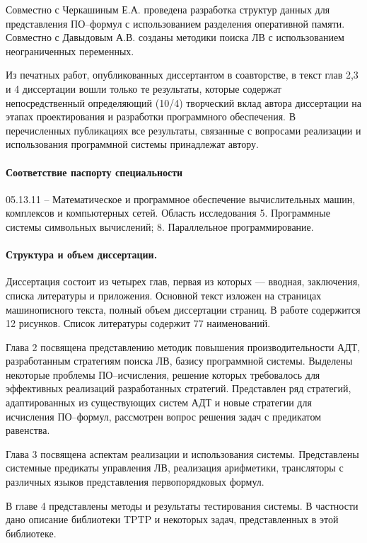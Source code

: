 Совместно с Черкашиным Е.А. проведена разработка структур данных для представления ПО--формул с использованием разделения оперативной памяти. Совместно с Давыдовым А.В. созданы методики поиска ЛВ с использованием неограниченных переменных.

Из печатных работ, опубликованных диссертантом в соавторстве, в текст глав 2,3 и 4 диссертации вошли только те результаты, которые содержат непосредственный определяющий (10/4) творческий вклад автора диссертации на этапах проектирования и разработки программного обеспечения. В перечисленных публикациях все результаты, связанные с вопросами реализации и использования программной системы принадлежат автору.

\paragraph{Соответствие паспорту специальности}
05.13.11 -- Математическое и программное обеспечение вычислительных машин, комплексов и компьютерных сетей. Область исследования 5. Программные системы символьных вычислений; 8. Параллельное программирование.

\paragraph{Структура и объем диссертации.} Диссертация состоит из четырех глав, первая из которых --- вводная, заключения, списка литературы и приложения. Основной текст изложен на \pageref{pg:main} страницах машинописного текста, полный объем диссертации \pageref{pg:total} страниц. В работе содержится 12 рисунков. Список литературы содержит 77 наименований.

Глава 2 посвящена представлению методик повышения производительности АДТ, разработанным стратегиям поиска ЛВ, базису программной системы. Выделены некоторые проблемы ПО--исчисления, решение которых требовалось для эффективных реализаций разработанных стратегий. Представлен ряд стратегий, адаптированных из существующих систем АДТ и новые стратегии для исчисления ПО--формул, рассмотрен вопрос решения задач с предикатом равенства.

Глава 3 посвящена аспектам реализации и использования системы. Представлены системные предикаты управления ЛВ, реализация арифметики, трансляторы с различных языков представления первопорядковых формул.

В главе 4 представлены методы и результаты тестирования системы. В частности дано описание библиотеки TPTP и некоторых задач, представленных в этой библиотеке. %

